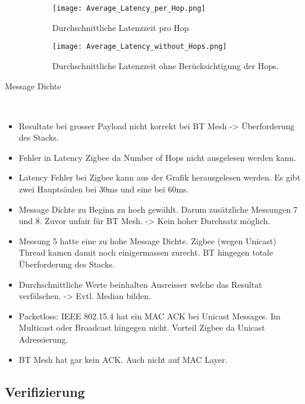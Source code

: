 \begin{description}
\begin{figure}[!htbp]
\centering
\begin{minipage}[b]{0.49\textwidth}
		\centering
		\texttt{[image: Average\_Latency\_per\_Hop.png]}
		\caption{Durchschnittliche Latenzzeit pro Hop}
		\label{fig:DurchschnittlicheLatenzzeitValidierung}
\end{minipage}
\begin{minipage}[b]{0.49\textwidth}
		\centering
		\texttt{[image: Average\_Latency\_without\_Hops.png]}
		\caption{Durchschnittliche Latenzzeit ohne Berücksichtigung der Hops.}	\label{fig:DurchschnittlicheLatenzzeitohneHopsValidierung}
\end{minipage}
\end{figure}

\item[Message Dichte]\hfill \\


 
\end{description}

\begin{itemize}
\item Resultate bei grosser Payload nicht korrekt bei BT Mesh -> Überforderung des Stacks.

\item Fehler in Latency Zigbee da Number of Hops nicht ausgelesen werden kann.

\item Latency Fehler bei Zigbee kann aus der Grafik herausgelesen werden. Es gibt zwei Hauptsäulen bei 30ms und eine bei 60ms.

\item Message Dichte zu Beginn zu hoch gewählt. Darum zusätzliche Messungen 7 und 8. Zuvor unfair für BT Mesh. -> Kein hoher Durchsatz möglich.

\item Messung 5 hatte eine zu hohe Message Dichte. Zigbee (wegen Unicast) Thread kamen damit noch einigermassen zurecht. BT hingegen totale Überforderung des Stacks.

\item Durchschnittliche Werte beinhalten Ausreisser welche das Resultat verfälschen. -> Evtl. Median bilden.

\item Packetloss: IEEE 802.15.4 hat ein MAC ACK bei Unicast Messages. Im Multicast oder Broadcast hingegen nicht. Vorteil Zigbee da Unicast Adressierung.

\item BT Mesh hat gar kein ACK. Auch nicht auf MAC Layer.

\end{itemize}

\subsection{Verifizierung}\label{subsec:Verifizierung}







